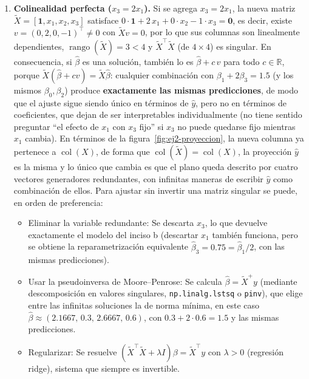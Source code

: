 \begin{enumerate}
\item \textbf{Colinealidad perfecta ($x_3 = 2x_1$).}
Si se agrega $x_3=2x_1$, la nueva matriz
$\tilde X=[\mathbf{1},x_1,x_2,x_3]$ satisface
$0\cdot\mathbf{1}+2\,x_1+0\cdot x_2-1\cdot x_3=\mathbf{0}$, es decir,
existe $v=(0,2,0,-1)^\top\neq0$ con $\tilde Xv=0$, por lo que sus
columnas son linealmente dependientes, $\operatorname{rango}(\tilde X)=3<4$
y $\tilde X^\top\tilde X$ (de $4\times4$) es singular. En consecuencia,
si $\hat\beta$ es una solución, también lo es $\hat\beta+c\,v$ para todo
$c\in\mathbb{R}$, porque $\tilde X(\hat\beta+cv)=\tilde X\hat\beta$:
cualquier combinación con $\beta_1+2\beta_3=1.5$ (y los mismos
$\beta_0,\beta_2$) produce \textbf{exactamente las mismas
predicciones}, de modo que el ajuste sigue siendo único en términos de
$\hat y$, pero no en términos de coeficientes, que dejan de ser
interpretables individualmente (no tiene sentido preguntar ``el efecto
de $x_1$ con $x_3$ fijo'' si $x_3$ no puede quedarse fijo mientras $x_1$
cambia). En términos de la figura~\ref{fig:ej2-proyeccion}, la nueva
columna ya pertenece a $\operatorname{col}(X)$, de forma que
$\operatorname{col}(\tilde X)=\operatorname{col}(X)$, la proyección
$\hat y$ es la misma y lo único que cambia es que el plano queda
descrito por cuatro vectores generadores redundantes, con infinitas
maneras de escribir $\hat y$ como combinación de ellos. Para ajustar sin invertir una matriz singular se puede, en
orden de preferencia:
\begin{itemize}
    \item Eliminar la variable redundante: Se descarta $x_3$, lo que
    devuelve exactamente el modelo del inciso b (descartar $x_1$ también
    funciona, pero se obtiene la reparametrización equivalente
    $\hat\beta_3=0.75=\hat\beta_1/2$, con las mismas predicciones).
    \item Usar la pseudoinversa de Moore--Penrose: Se calcula
    $\hat\beta=\tilde X^{+}y$ (mediante descomposición en valores
    singulares, \texttt{np.linalg.lstsq} o \texttt{pinv}), que elige
    entre las infinitas soluciones la de norma mínima, en este caso
    $\hat\beta\approx(2.1667,\,0.3,\,2.6667,\,0.6)$, con
    $0.3+2\cdot0.6=1.5$ y las mismas predicciones.
    \item Regularizar: Se resuelve
    $(\tilde X^\top\tilde X+\lambda I)\beta=\tilde X^\top y$ con
    $\lambda>0$ (regresión ridge), sistema que siempre es invertible.
\end{itemize}


\end{enumerate}
